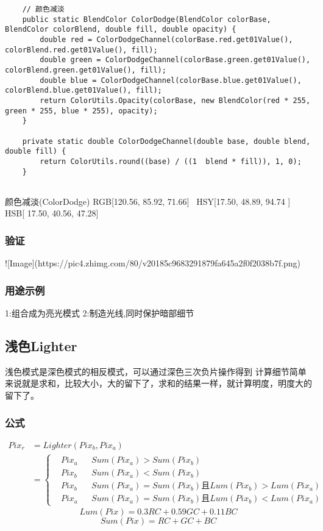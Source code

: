 \begin{lstlisting}
	// 颜色减淡
	public static BlendColor ColorDodge(BlendColor colorBase, BlendColor colorBlend, double fill, double opacity) {
		double red = ColorDodgeChannel(colorBase.red.get01Value(), colorBlend.red.get01Value(), fill);
		double green = ColorDodgeChannel(colorBase.green.get01Value(), colorBlend.green.get01Value(), fill);
		double blue = ColorDodgeChannel(colorBase.blue.get01Value(), colorBlend.blue.get01Value(), fill);
		return ColorUtils.Opacity(colorBase, new BlendColor(red * 255, green * 255, blue * 255), opacity);
	}
	
	private static double ColorDodgeChannel(double base, double blend, double fill) {
		return ColorUtils.round((base) / ((1  blend * fill)), 1, 0);
	}
	
\end{lstlisting}



颜色减淡(ColorDodge)    RGB[120.56,  85.92,  71.66]~ HSY[17.50,  48.89,  94.74 ]~ HSB[ 17.50,  40.56,  47.28]


\subsubsection{ 验证}

![Image](https://pic4.zhimg.com/80/v20185c9683291879fa645a2f0f2038b7f.png)

\subsubsection{ 用途示例}

1:组合成为亮光模式
2:制造光线,同时保护暗部细节

\subsection{ 浅色Lighter}

浅色模式是深色模式的相反模式，可以通过深色三次负片操作得到
计算细节简单来说就是求和，比较大小，大的留下了，求和的结果一样，就计算明度，明度大的留下了。

\subsubsection{ 公式}

$$\begin{aligned}
	Pix_r &=Lighter(Pix_b,Pix_a)\\&=\left\{\begin{aligned}&Pix_a && Sum(Pix_a)>Sum(Pix_b)\\&Pix_b&&  Sum(Pix_a)<Sum(Pix_b)\\&Pix_b&&  Sum(Pix_a)=Sum(Pix_b)且Lum(Pix_b)>Lum(Pix_a)\\&Pix_a&&  Sum(Pix_a)=Sum(Pix_b)且Lum(Pix_b)<Lum(Pix_a)\end{aligned}\right.
\end{aligned}$$
$$Lum(Pix) = 0.3RC+0.59GC+0.11BC$$
$$Sum(Pix) = RC+GC+BC$$

